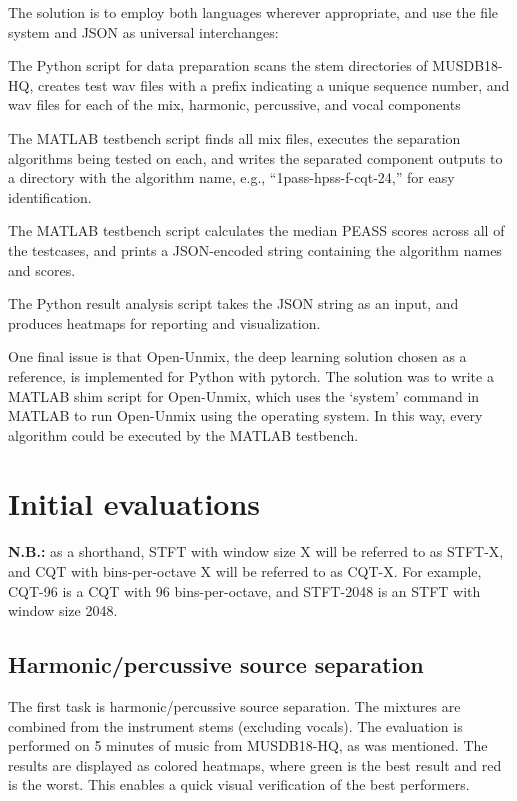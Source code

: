 \documentclass[10pt,letter]{article}
\newenvironment{tight_enumerate}{
\begin{enumerate}
\setlength{\itemsep}{0pt}
\setlength{\parskip}{0pt}
}{\end{enumerate}}
\begin{document}
The solution is to employ both languages wherever appropriate, and use the file system and JSON as universal interchanges:
\begin{tight_enumerate}
\vspace{-0.5em}
\item
	The Python script for data preparation scans the stem directories of MUSDB18-HQ, creates test wav files with a prefix indicating a unique sequence number, and wav files for each of the mix, harmonic, percussive, and vocal components
\item
	The MATLAB testbench script finds all mix files, executes the separation algorithms being tested on each, and writes the separated component outputs to a directory with the algorithm name, e.g., ``1pass-hpss-f-cqt-24,'' for easy identification.
\item
	The MATLAB testbench script calculates the median PEASS scores across all of the testcases, and prints a JSON-encoded string containing the algorithm names and scores.
\item
	The Python result analysis script takes the JSON string as an input, and produces heatmaps for reporting and visualization.
\end{tight_enumerate}

One final issue is that Open-Unmix, the deep learning solution chosen as a reference, is implemented for Python with pytorch\cite{pytorch}. The solution was to write a MATLAB shim script for Open-Unmix, which uses the `system' command in MATLAB to run Open-Unmix using the operating system. In this way, every algorithm could be executed by the MATLAB testbench.

\section{Initial evaluations}
\label{sec:elim}

\textbf{N.B.:} as a shorthand, STFT with window size X will be referred to as STFT-X, and CQT with bins-per-octave X will be referred to as CQT-X. For example, CQT-96 is a CQT with 96 bins-per-octave, and STFT-2048 is an STFT with window size 2048.

\subsection{Harmonic/percussive source separation}

The first task is harmonic/percussive source separation. The mixtures are combined from the instrument stems (excluding vocals). The evaluation is performed on 5 minutes of music from MUSDB18-HQ, as was mentioned. The results are displayed as colored heatmaps, where green is the best result and red is the worst. This enables a quick visual verification of the best performers.
\end{document}

